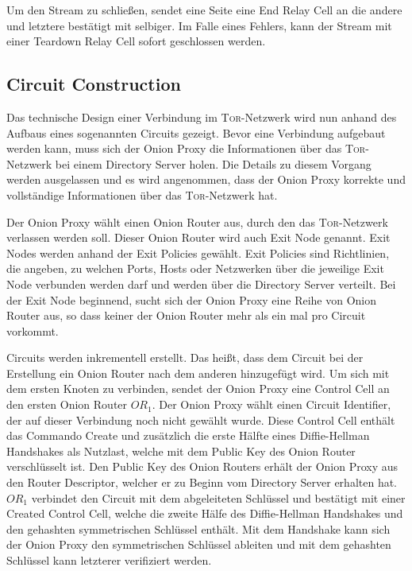 \documentclass[fleqn,envcountsame,runningheads,10pt,a4paper]{llncs}
\begin{document}
Um den Stream zu schließen, sendet eine Seite eine End Relay Cell an die andere und letztere bestätigt mit selbiger. Im Falle eines Fehlers, kann der Stream mit einer Teardown Relay Cell sofort geschlossen werden.

\subsection{Circuit Construction}
\label{sec:ciruit_construction} 

Das technische Design einer Verbindung im \textsc{Tor}-Netzwerk wird nun anhand des Aufbaus eines sogenannten Circuits gezeigt. Bevor eine Verbindung aufgebaut werden kann, muss sich der Onion Proxy die Informationen über das \textsc{Tor}-Netzwerk bei einem Directory Server holen. Die Details zu diesem Vorgang werden ausgelassen und es wird angenommen, dass der Onion Proxy korrekte und vollständige Informationen über das \textsc{Tor}-Netzwerk hat.

Der Onion Proxy wählt einen Onion Router aus, durch den das \textsc{Tor}-Netzwerk verlassen werden soll. Dieser Onion Router wird auch Exit Node genannt. Exit Nodes werden anhand der Exit Policies gewählt. Exit Policies  sind Richtlinien, die angeben, zu welchen Ports, Hosts oder Netzwerken über die jeweilige Exit Node verbunden werden darf und werden über die Directory Server verteilt. Bei der Exit Node beginnend, sucht sich der Onion Proxy eine Reihe von Onion Router aus, so dass keiner der Onion Router mehr als ein mal pro Circuit vorkommt.

Circuits werden inkrementell erstellt. Das heißt, dass dem Circuit bei der Erstellung ein Onion Router nach dem anderen hinzugefügt wird. Um sich mit dem ersten Knoten zu verbinden, sendet der Onion Proxy eine Control Cell an den ersten Onion Router $\textit{OR}_1$. Der Onion Proxy wählt einen Circuit Identifier, der auf dieser Verbindung noch nicht gewählt wurde. Diese Control Cell enthält das Commando Create und zusätzlich die erste Hälfte eines Diffie-Hellman Handshakes als Nutzlast, welche mit dem Public Key des Onion Router verschlüsselt ist. Den Public Key des Onion Routers erhält der Onion Proxy aus den Router Descriptor, welcher er zu Beginn vom Directory Server erhalten hat. $\textit{OR}_1$ verbindet den Circuit mit dem abgeleiteten Schlüssel und  bestätigt mit einer Created Control Cell, welche die zweite Hälfe des Diffie-Hellman Handshakes und den gehashten symmetrischen Schlüssel enthält. Mit dem Handshake kann sich der Onion Proxy den symmetrischen Schlüssel ableiten und mit dem gehashten Schlüssel kann letzterer verifiziert werden.
\end{document}
